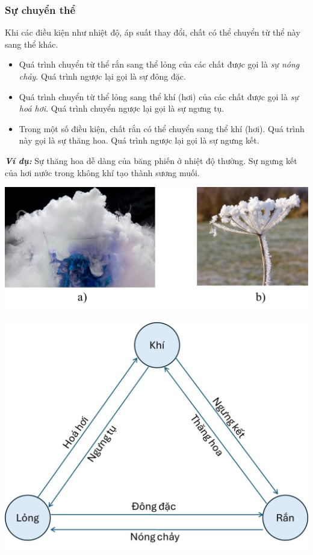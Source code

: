 \subsubsection{Sự chuyển thể}
\begin{boxdn}
	Khi các điều kiện như nhiệt độ, áp suất thay đổi, chất có thể chuyển từ thể này sang thể khác.
	\begin{itemize}
		\item Quá trình chuyển từ thể rắn sang thể lỏng của các chất được gọi là \textit{sự nóng chảy}. Quá trình ngược lại gọi là sự đông đặc.
		\item Quá trình chuyển từ thể lỏng sang thể khí (hơi) của các chất được gọi là \textit{sự hoá hơi}. Quá trình chuyển ngược lại gọi là sự ngưng tụ.
		\item Trong một số điều kiện, chất rắn có thể chuyển sang thể khí (hơi). Quá trình này gọi là sự thăng hoa. Quá trình ngược lại gọi là sự ngưng kết.\\
	\end{itemize}
\end{boxdn}
\begin{boxvidu}
	\textit{\textbf{Ví dụ:}} Sự thăng hoa dễ dàng của băng phiến ở nhiệt độ thường. Sự ngưng kết của hơi nước trong không khí tạo thành sương muối.
\end{boxvidu}
	\begin{center}
		\includegraphics[width=0.7\linewidth]{figs/VN12-Y24-PH-SYL-001-7}
	\end{center}

\begin{center}
	\includegraphics[width=0.5\linewidth]{figs/VN12-Y24-PH-SYL-001-4}
\end{center}
